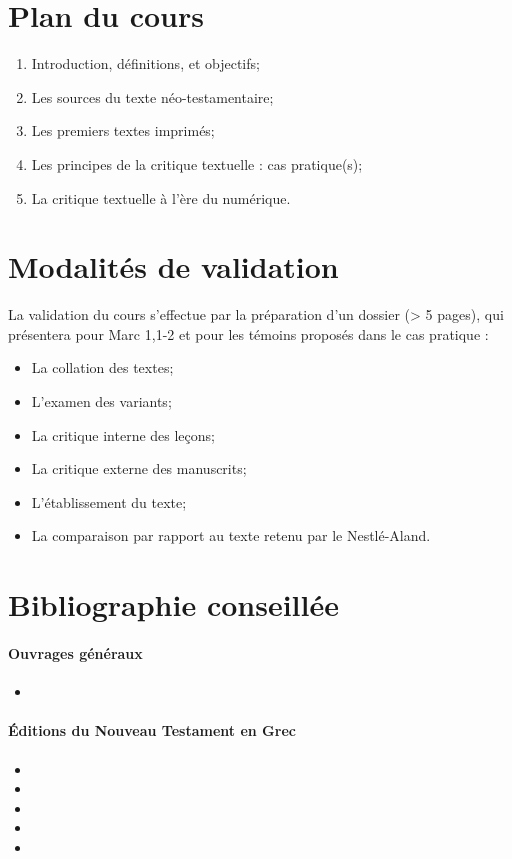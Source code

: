 \documentclass[a4, 12pt]{article}
\begin{document}
\section{Plan du cours}
\begin{enumerate}
    \item Introduction, définitions, et objectifs;
    \item Les sources du texte néo-testamentaire;
    \item Les premiers textes imprimés;
    \item Les principes de la critique textuelle : cas pratique(s);
    \item La critique textuelle à l'ère du numérique.
\end{enumerate}

\section{Modalités de validation}

La validation du cours s'effectue par la préparation d'un dossier (> 5 pages), qui présentera pour Marc 1,1-2 et pour les témoins proposés dans le cas pratique :
\begin{itemize}
    \item La collation des textes;
    \item L'examen des variants;
    \item La critique interne des leçons;
    \item La critique externe des manuscrits;
    \item L'établissement du texte;
    \item La comparaison par rapport au texte retenu par le Nestlé-Aland.
\end{itemize}

\section{Bibliographie conseillée}

\paragraph{Ouvrages généraux}

\begin{itemize}
    \item {}
\end{itemize}

\paragraph{Éditions du Nouveau Testament en Grec}
\begin{itemize}
    \item {}
    \item {}
    \item {}
    \item {}
    \item {}
    \end{itemize}
\end{document}
